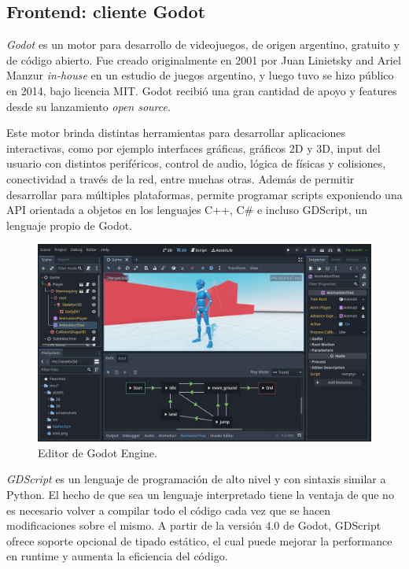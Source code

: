 
\subsection{Frontend: cliente Godot}

\noindent \textit{Godot} es un motor para desarrollo de videojuegos, de origen argentino, gratuito y de código abierto. 
Fue creado originalmente en 2001 por Juan Linietsky and Ariel Manzur \textit{in-house} en un estudio de juegos argentino,
y luego tuvo se hizo público en 2014, bajo licencia MIT. Godot recibió una gran cantidad de apoyo y features desde su 
lanzamiento \textit{open source}.

Este motor brinda distintas herramientas para desarrollar aplicaciones interactivas, como por ejemplo 
interfaces gráficas, gráficos 2D y 3D, input del usuario con distintos periféricos, control de audio, 
lógica de físicas y colisiones, conectividad a través de la red, entre muchas otras.
Además de permitir desarrollar para múltiples plataformas, permite programar scripts exponiendo una 
API orientada a objetos en los lenguajes C++, C\# e incluso GDScript, un lenguaje propio de Godot. 

\begin{figure}[htbp]
    \centering
    \includegraphics[width=1.0\textwidth]{../assets/godot-engine-showcase.png}
    \caption{Editor de Godot Engine.\cite{ref1}}
\end{figure}

\textit{GDScript} es un lenguaje de programación de alto nivel y con sintaxis similar a Python. 
El hecho de que sea un lenguaje interpretado tiene la ventaja de que no es necesario volver a compilar 
todo el código cada vez que se hacen modificaciones sobre el mismo.
A partir de la versión 4.0 de Godot, GDScript ofrece soporte opcional de tipado estático, el cual puede
mejorar la performance en runtime y aumenta la eficiencia del código.

